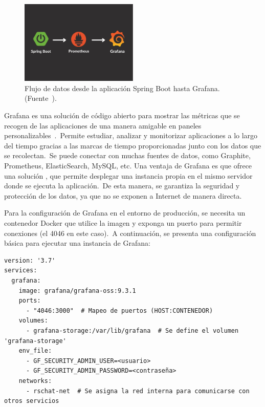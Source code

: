 \begin{figure}[H]
	\centering
	\includegraphics[width=0.5\textwidth]{res/images/cover}
	\caption{Flujo de datos desde la aplicación Spring Boot hasta Grafana. (Fuente~\cite{prometheus-flow}).}
	\label{fig:prometheus-flow}
\end{figure}

Grafana es una solución de código abierto para mostrar las métricas que se recogen de las aplicaciones de una
manera amigable en paneles personalizables~\cite{what-is-grafana}.\ Permite estudiar, analizar y monitorizar
aplicaciones a lo largo del tiempo gracias a las marcas de tiempo proporcionadas junto con los datos que se
recolectan.\ Se puede conectar con muchas fuentes de datos, como Graphite, Prometheus, ElasticSearch, MySQL, etc.
Una ventaja de Grafana es que ofrece una solución , que permite desplegar una instancia propia en
el mismo servidor donde se ejecuta la aplicación.\ De esta manera, se garantiza la seguridad y protección de los
datos, ya que no se exponen a Internet de manera directa.

Para la configuración de Grafana en el entorno de producción, se necesita un contenedor Docker que utilice la imagen
 y exponga un puerto para permitir conexiones (el 4046 en este caso).\ A continuación,
se presenta una configuración básica para ejecutar una instancia de Grafana:

\begin{codeBlock}
	\begin{verbatim}
version: '3.7'
services:
  grafana:
    image: grafana/grafana-oss:9.3.1
    ports:
      - "4046:3000"  # Mapeo de puertos (HOST:CONTENEDOR)
    volumes:
      - grafana-storage:/var/lib/grafana  # Se define el volumen 'grafana-storage'
    env_file:
      - GF_SECURITY_ADMIN_USER=<usuario>
      - GF_SECURITY_ADMIN_PASSWORD=<contraseña>
    networks:
      - rschat-net  # Se asigna la red interna para comunicarse con otros servicios
	\end{verbatim}
	\caption{Configuración mínima para ejecutar un contenedor con Grafana. (Fuente: Elaboración propia).}
	\label{cod:grafana-docker-compose}
\end{codeBlock}

